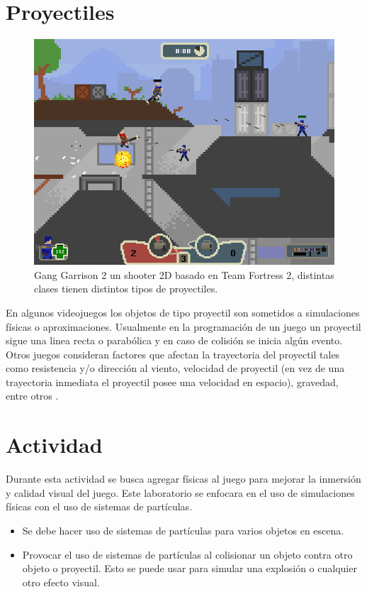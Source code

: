 \section{Proyectiles}
\setlength\intextsep{0pt}
\begin{figure}
\includegraphics[width=\linewidth]{media/Gang_Garrison_2.png}
\caption{Gang Garrison 2 un shooter 2D basado en Team Fortress 2, distintas clases tienen distintos tipos de proyectiles.}
\label{fig:ganggarrison2}
\end{figure}

En algunos videojuegos los objetos de tipo proyectil son sometidos a simulaciones físicas o aproximaciones. Usualmente en la programación de un juego un proyectil sigue una linea recta o parabólica y en caso de colisión se inicia algún evento. Otros juegos consideran factores que afectan la trayectoria del proyectil tales como resistencia y/o dirección al viento, velocidad de proyectil (en vez de una trayectoria inmediata el proyectil posee una velocidad en espacio), gravedad, entre otros \cite{fifa_physics}.~\\

\section{Actividad}
Durante esta actividad se busca agregar físicas al juego para mejorar la inmersión y calidad visual del juego. Este laboratorio se enfocara en el uso de simulaciones físicas con el uso de sistemas de partículas.
\begin{itemize}
\item Se debe hacer uso de sistemas de partículas para varios objetos en escena.
\item Provocar el uso de sistemas de partículas al colisionar un objeto contra otro objeto o proyectil. Esto se puede usar para simular una explosión o cualquier otro efecto visual.
\end{itemize}
